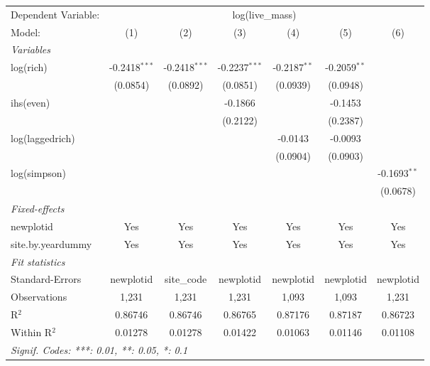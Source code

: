 \begin{tabular}{lcccccc}
\tabularnewline\midrule\midrule
Dependent Variable:&\multicolumn{6}{c}{log(live\_mass)}\\
Model:&(1) & (2) & (3) & (4) & (5) & (6)\\
\midrule \emph{Variables}&   &   &   &   &   &  \\
log(rich)&-0.2418$^{***}$ & -0.2418$^{***}$ & -0.2237$^{***}$ & -0.2187$^{**}$ & -0.2059$^{**}$ &   \\
  &(0.0854) & (0.0892) & (0.0851) & (0.0939) & (0.0948) &   \\
ihs(even)&   &    & -0.1866 &    & -0.1453 &   \\
  &   &    & (0.2122) &    & (0.2387) &   \\
log(laggedrich)&   &    &    & -0.0143 & -0.0093 &   \\
  &   &    &    & (0.0904) & (0.0903) &   \\
log(simpson)&   &    &    &    &    & -0.1693$^{**}$\\
  &   &    &    &    &    & (0.0678)\\
\midrule \emph{Fixed-effects}&   &   &   &   &   &  \\
newplotid & Yes & Yes & Yes & Yes & Yes & Yes\\
site.by.yeardummy & Yes & Yes & Yes & Yes & Yes & Yes\\
\midrule \emph{Fit statistics}&  & & & & & \\
Standard-Errors& newplotid&site\_code&newplotid&newplotid&newplotid&newplotid\\
Observations & 1,231&1,231&1,231&1,093&1,093&1,231\\
R$^2$ & 0.86746&0.86746&0.86765&0.87176&0.87187&0.86723\\
Within R$^2$ & 0.01278&0.01278&0.01422&0.01063&0.01146&0.01108\\
\midrule\midrule\multicolumn{7}{l}{\emph{Signif. Codes: ***: 0.01, **: 0.05, *: 0.1}}\\
\end{tabular}


